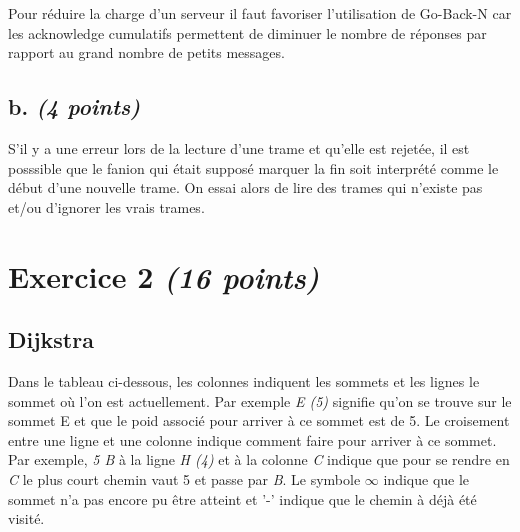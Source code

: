 \documentclass{article}
\begin{document}
Pour réduire la charge d'un serveur il faut favoriser l'utilisation de Go-Back-N car les acknowledge cumulatifs permettent de diminuer le nombre de réponses par rapport au grand nombre de petits messages.

\subsection{b. \emph{(4 points)}}
S'il y a une erreur lors de la lecture d'une trame et qu'elle est rejetée, il est posssible que le fanion qui était supposé marquer la fin soit interprété comme le début d'une nouvelle trame. On essai alors de lire des trames qui n'existe pas et/ou d'ignorer les vrais trames.

\clearpage

\section{Exercice 2 \emph{(16 points)}}

\subsection{Dijkstra}

Dans le tableau ci-dessous, les colonnes indiquent les sommets et les lignes le sommet où l'on est actuellement. Par exemple \emph{E (5)} signifie qu'on se trouve sur le sommet E et que le poid associé pour arriver à ce sommet est de 5. Le croisement entre une ligne et une colonne indique comment faire pour arriver à ce sommet. Par exemple, \emph{5 B} à la ligne \emph{H (4)} et à la colonne \emph{C} indique que pour se rendre en \emph{C} le plus court chemin vaut 5 et passe par \emph{B}. Le symbole $\infty$ indique que le sommet n'a pas encore pu être atteint et '-' indique que le chemin à déjà été visité. 

\hfill
\end{document}
